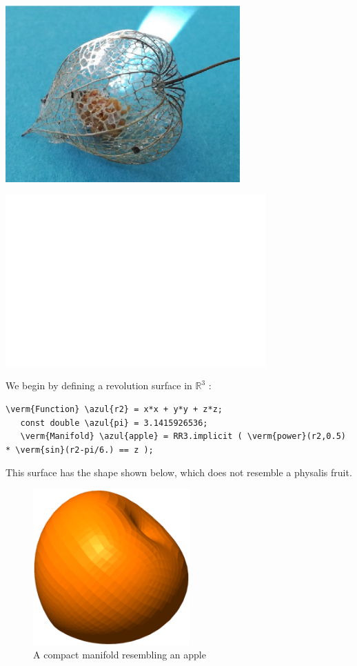 {\vskip -3mm
\if{}
\centerline{\includegraphics[width=90mm]{dry-physalis}}
\else
{}
\centerline{\includegraphics[width=100mm]{fake-physalis}}
\fi}
\vfil\eject

We begin by defining a revolution surface in $ \mathbb{R}^3 $ :

\begin{Verbatim}[commandchars=\\\{\},formatcom=\small\tt,frame=single,
   label=parag-\ref{\numb section 2.\numb parag 10}.cpp,rulecolor=\color{coment},
   baselinestretch=0.94,framesep=2mm]
   \verm{Function} \azul{r2} = x*x + y*y + z*z;
   const double \azul{pi} = 3.1415926536;
   \verm{Manifold} \azul{apple} = RR3.implicit ( \verm{power}(r2,0.5) * \verm{sin}(r2-pi/6.) == z );
\end{Verbatim}

This surface has the shape shown below, which does not resemble a physalis fruit.

\begin{figure}[ht] \centering
  \includegraphics[width=60mm]{fisalis-manif}
  \caption{A compact manifold resembling an apple}
  \label{\numb section 2.\numb fig 11}
\end{figure}

